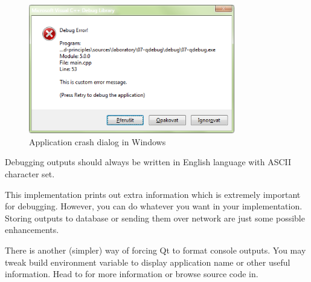 \begin{figure}[ht]
\centering\includegraphics[width=9cm]{graphics/laboratory/11-debugdialog.png}
\caption{Application crash dialog in Windows}\label{figure:errordialog}
\end{figure}

\begin{fdocextra}
Debugging outputs should always be written in English language with ASCII character set.
\end{fdocextra}

This implementation prints out extra information which is extremely important for debugging. However, you can do whatever you want in your implementation. Storing outputs to database or sending them over network are just some possible enhancements.

There is another (simpler) way of forcing Qt to format console outputs. You may tweak build environment variable to display application name or other useful information. Head to \citep{various:qtdoc} for more information or browse source code in.
